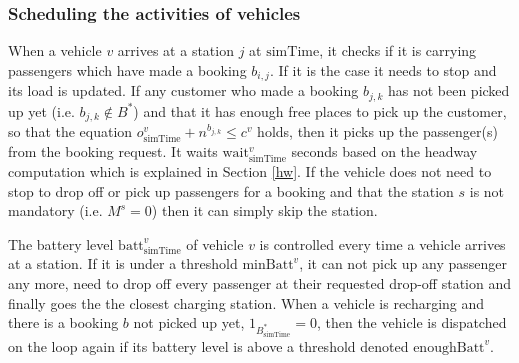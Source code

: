 \documentclass[12pt,a4paper]{article}
\begin{document}
\subsubsection{Scheduling the activities of vehicles}\label{schedule}
When a vehicle $v$ arrives at a station $j$ at $\text{simTime}$, it checks if it is carrying passengers which have made a booking $b_{i,j}$. If it is the case it needs to stop and its load is updated. If any customer who made a booking $b_{j,k}$ has not been picked up yet (i.e. $b_{j,k} \not\in B^{*}$) and that it has enough free places to pick up the customer, so that the equation $o^{v}_{\text{simTime}} + n^{b_{j,k}} \leq c^{v}$ holds, then it picks up the passenger(s) from the booking request. It waits $\text{wait}^{v}_{\text{simTime}}$ seconds based on the headway computation which is explained in Section \ref{hw}. If the vehicle does not need to stop to drop off or pick up passengers for a booking and that the station $s$ is not mandatory (i.e. $M^{s} = 0$) then it can simply skip the station.   

The battery level $\text{batt}^{v}_{\text{simTime}}$ of vehicle $v$ is controlled every time a vehicle arrives at a station. If it is under a threshold $\text{minBatt}^{v}$, it can not pick up any passenger any more, need to drop off every passenger at their requested drop-off station and finally goes the the closest charging station. When a vehicle is recharging and there is a booking $b$ not picked up yet, $1_{B^{*}_{\text{simTime}}} = 0$, then the vehicle is dispatched on the loop again if its battery level is above a threshold denoted $\text{enoughBatt}^{v}$. 
\end{document}
